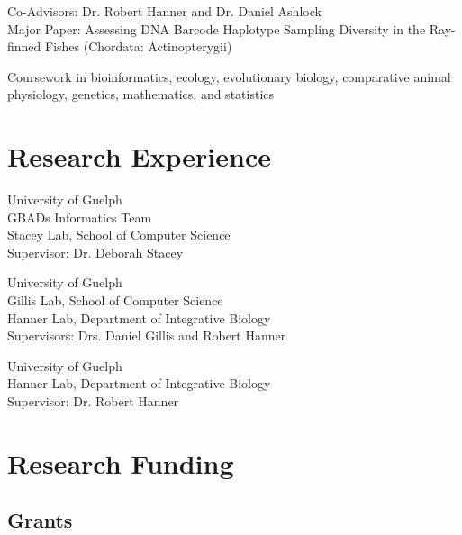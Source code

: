 \medskip
{}
Co-Advisors: Dr. Robert Hanner and Dr. Daniel Ashlock\\
Major Paper: Assessing DNA Barcode Haplotype Sampling Diversity in the
Ray-finned Fishes (Chordata: Actinopterygii)

\medskip
{}
Coursework in bioinformatics, ecology, evolutionary biology, comparative animal
physiology, genetics, mathematics, and statistics

\section{Research Experience}
University of Guelph\\
GBADs Informatics Team\\
Stacey Lab, School of Computer Science\\
Supervisor: Dr. Deborah Stacey

\medskip
{}
University of Guelph\\
Gillis Lab, School of Computer Science\\
Hanner Lab, Department of Integrative Biology\\
Supervisors: Drs. Daniel Gillis and Robert Hanner

\medskip
{}
University of Guelph\\
Hanner Lab, Department of Integrative Biology\\
Supervisor: Dr. Robert Hanner

\section{Research Funding}

\subsection{Grants}
